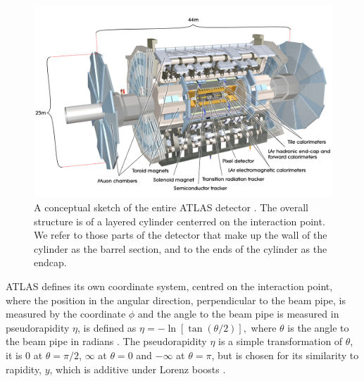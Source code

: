 \begin{english}
\begin{figure}[hbtp]
\begin{minipage}[b]{.69\textwidth}
\includegraphics[width=1\textwidth]{AllAtlasBig}
\end{minipage}
\begin{minipage}[b]{.3\textwidth}
\caption{A conceptual sketch of the entire ATLAS detector \cite{atlasweb}. The overall structure is of a layered cylinder centerred on the interaction point. We refer to those parts of the detector that make up the wall of the cylinder as the barrel section, and to the ends of the cylinder as the endcap.}
\end{minipage}
\label{allatlas}
\end{figure}

ATLAS defines its own coordinate system, centred on the interaction point, where the position in the angular direction, perpendicular to the beam pipe, is measured by the coordinate $\phi$ and the angle to the beam pipe is measured in pseudorapidity $\eta$, is defined as
\(\eta=-\ln[\tan(\theta/2)],\)
where $\theta$ is the angle to the beam pipe in radians \cite{green:eta}. The pseudorapidity $\eta$ is a simple transformation of $\theta$, it is 0 at $\theta=\pi/2$, $\infty$ at $\theta=0$ and $-\infty$ at $\theta=\pi$, but is chosen for its similarity to rapidity, $y$, which is additive under Lorenz boosts \cite{green:y}.


\end{english}
